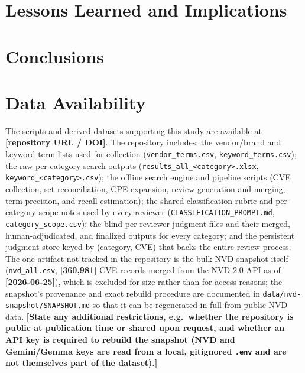 \documentclass[conference]{IEEEtran}
\newcommand{\stub}[1][?]{{\color{red}\textbf{[#1]}}}
\begin{document}
\section{Lessons Learned and Implications}
\label{sec:lessons}


\section{Conclusions}
\label{sec:conclusion}


\section*{Data Availability}

The scripts and derived datasets supporting this study are available at
\stub[repository URL / DOI]. The repository includes: the vendor/brand and keyword term
lists used for collection (\texttt{vendor\_terms.csv}, \texttt{keyword\_terms.csv}); the
raw per-category search outputs (\texttt{results\_all\_<category>.xlsx},
\texttt{keyword\_<category>.csv}); the offline search engine and pipeline scripts (CVE
collection, set reconciliation, CPE expansion, review generation and merging, term-precision,
and recall estimation); the shared classification rubric and per-category scope notes used
by every reviewer (\texttt{CLASSIFICATION\_PROMPT.md}, \texttt{category\_scope.csv}); the
blind per-reviewer judgment files and their merged, human-adjudicated, and finalized outputs
for every category; and the persistent judgment store keyed by (category, CVE) that backs
the entire review process. The one artifact not tracked in the repository is the bulk NVD
snapshot itself (\texttt{nvd\_all.csv}, \stub[360{,}981] CVE records merged from the NVD 2.0
API as of \stub[2026-06-25]), which is excluded for size rather than for access reasons; the
snapshot's provenance and exact rebuild procedure are documented in
\texttt{data/nvd-snapshot/SNAPSHOT.md} so that it can be regenerated in full from public NVD
data. \stub[State any additional restrictions, e.g.\ whether the repository is public at
publication time or shared upon request, and whether an API key is required to rebuild the
snapshot (NVD and Gemini/Gemma keys are read from a local, gitignored \texttt{.env} and are
not themselves part of the dataset).]
\end{document}
